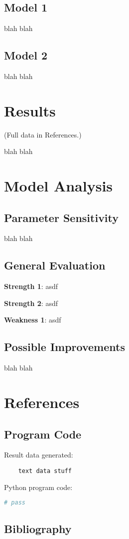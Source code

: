 \documentclass{mcmthesis}
\begin{document}
    \subsection{Model 1}
    blah blah

    \subsection{Model 2}
    blah blah


    \section{Results}
    \noindent (Full data in References.)

    blah blah


    \section{Model Analysis}

    \subsection{Parameter Sensitivity}
    blah blah

    \subsection{General Evaluation}

    \noindent\textbf{Strength 1}: asdf

    \noindent\textbf{Strength 2}: asdf

    \noindent\textbf{Weakness 1}: asdf

    \subsection{Possible Improvements}
    blah blah


    \newpage


    \section{References}

    \subsection{Program Code}
    \noindent Result data generated:
    \begin{verbatim}
    text data stuff

    \end{verbatim}

    \noindent Python program code:
    \begin{lstlisting}[language=Python]
        # pass

    \end{lstlisting}

    \subsection{Bibliography}
\end{document}
